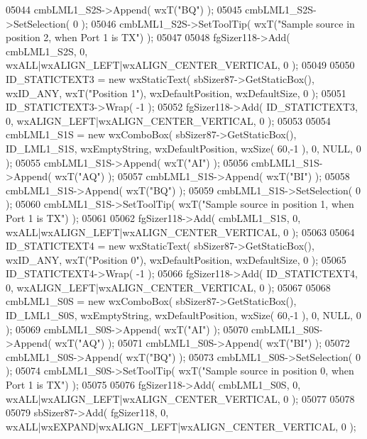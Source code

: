 \begin{DoxyCode}
05044     cmbLML1_S2S->Append( wxT(\textcolor{stringliteral}{"BQ"}) );
05045     cmbLML1_S2S->SetSelection( 0 );
05046     cmbLML1_S2S->SetToolTip( wxT(\textcolor{stringliteral}{"Sample source in position 2, when Port 1 is TX"}) );
05047     
05048     fgSizer118->Add( cmbLML1_S2S, 0, wxALL|wxALIGN\_LEFT|wxALIGN\_CENTER\_VERTICAL, 0 );
05049     
05050     ID_STATICTEXT3 = \textcolor{keyword}{new} wxStaticText( sbSizer87->GetStaticBox(), wxID\_ANY, wxT(\textcolor{stringliteral}{"Position 1"}), 
      wxDefaultPosition, wxDefaultSize, 0 );
05051     ID_STATICTEXT3->Wrap( -1 );
05052     fgSizer118->Add( ID_STATICTEXT3, 0, wxALIGN\_LEFT|wxALIGN\_CENTER\_VERTICAL, 0 );
05053     
05054     cmbLML1_S1S = \textcolor{keyword}{new} wxComboBox( sbSizer87->GetStaticBox(), ID_LML1_S1S, wxEmptyString, wxDefaultPosition,
       wxSize( 60,-1 ), 0, NULL, 0 );
05055     cmbLML1_S1S->Append( wxT(\textcolor{stringliteral}{"AI"}) );
05056     cmbLML1_S1S->Append( wxT(\textcolor{stringliteral}{"AQ"}) );
05057     cmbLML1_S1S->Append( wxT(\textcolor{stringliteral}{"BI"}) );
05058     cmbLML1_S1S->Append( wxT(\textcolor{stringliteral}{"BQ"}) );
05059     cmbLML1_S1S->SetSelection( 0 );
05060     cmbLML1_S1S->SetToolTip( wxT(\textcolor{stringliteral}{"Sample source in position 1, when Port 1 is TX"}) );
05061     
05062     fgSizer118->Add( cmbLML1_S1S, 0, wxALL|wxALIGN\_LEFT|wxALIGN\_CENTER\_VERTICAL, 0 );
05063     
05064     ID_STATICTEXT4 = \textcolor{keyword}{new} wxStaticText( sbSizer87->GetStaticBox(), wxID\_ANY, wxT(\textcolor{stringliteral}{"Position 0"}), 
      wxDefaultPosition, wxDefaultSize, 0 );
05065     ID_STATICTEXT4->Wrap( -1 );
05066     fgSizer118->Add( ID_STATICTEXT4, 0, wxALIGN\_LEFT|wxALIGN\_CENTER\_VERTICAL, 0 );
05067     
05068     cmbLML1_S0S = \textcolor{keyword}{new} wxComboBox( sbSizer87->GetStaticBox(), ID_LML1_S0S, wxEmptyString, wxDefaultPosition,
       wxSize( 60,-1 ), 0, NULL, 0 );
05069     cmbLML1_S0S->Append( wxT(\textcolor{stringliteral}{"AI"}) );
05070     cmbLML1_S0S->Append( wxT(\textcolor{stringliteral}{"AQ"}) );
05071     cmbLML1_S0S->Append( wxT(\textcolor{stringliteral}{"BI"}) );
05072     cmbLML1_S0S->Append( wxT(\textcolor{stringliteral}{"BQ"}) );
05073     cmbLML1_S0S->SetSelection( 0 );
05074     cmbLML1_S0S->SetToolTip( wxT(\textcolor{stringliteral}{"Sample source in position 0, when Port 1 is TX"}) );
05075     
05076     fgSizer118->Add( cmbLML1_S0S, 0, wxALL|wxALIGN\_LEFT|wxALIGN\_CENTER\_VERTICAL, 0 );
05077     
05078     
05079     sbSizer87->Add( fgSizer118, 0, wxALL|wxEXPAND|wxALIGN\_LEFT|wxALIGN\_CENTER\_VERTICAL, 0 );

\end{DoxyCode}
